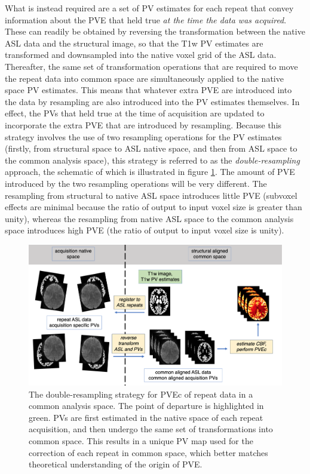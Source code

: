 \documentclass[12pt]{report}
\begin{document}
What is instead required are a set of PV estimates for each repeat that convey information about the PVE that held true \textit{at the time the data was acquired}. These can readily be obtained by reversing the transformation between the native ASL data and the structural image, so that the T1w PV estimates are transformed and downsampled into the native voxel grid of the ASL data. Thereafter, the same set of transformation operations that are required to move the repeat data into common space are simultaneously applied to the native space PV estimates. This means that whatever extra PVE are introduced into the data by resampling are also introduced into the PV estimates themselves. In effect, the PVs that held true at the time of acquisition are updated to incorporate the extra PVE that are introduced by resampling. Because this strategy involves the use of two resampling operations for the PV estimates (firstly, from structural space to ASL native space, and then from ASL space to the common analysis space), this strategy is referred to as the \textit{double-resampling} approach, the schematic of which is illustrated in figure \ref{dbl_paradox}. The amount of PVE introduced by the two resampling operations will be very different. The resampling from structural to native ASL space introduces little PVE (subvoxel effects are minimal because the ratio of output to input voxel size is greater than unity), whereas the resampling from native ASL space to the common analysis space introduces high PVE (the ratio of output to input voxel size is unity). 

\begin{figure}
\centering
\includegraphics[width = \textwidth]{dbl_paradox.png}
\caption{The double-resampling strategy for PVEc of repeat data in a common analysis space. The point of departure is highlighted in green. PVs are first estimated in the native space of each repeat acquisition, and then undergo the same set of transformations into common space. This results in a unique PV map used for the correction of each repeat in common space, which better matches theoretical understanding of the origin of PVE.}
\label{dbl_paradox}
\end{figure} 
\end{document}
